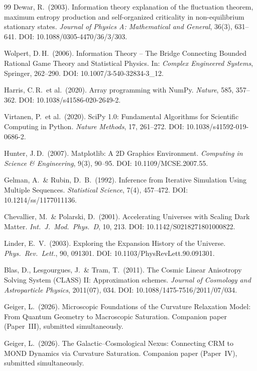 \documentclass[aps,prd,twocolumn,superscriptaddress,nofootinbib]{revtex4-2}
\begin{document}
\begin{thebibliography}{99}
Dewar, R.\ (2003).
Information theory explanation of the fluctuation theorem, maximum entropy production and self-organized criticality in non-equilibrium stationary states.
\textit{Journal of Physics A: Mathematical and General}, 36(3), 631--641.
DOI: 10.1088/0305-4470/36/3/303.

Wolpert, D.\,H.\ (2006).
Information Theory -- The Bridge Connecting Bounded Rational Game Theory and Statistical Physics.
In: \textit{Complex Engineered Systems}, Springer, 262--290.
DOI: 10.1007/3-540-32834-3\_12.

Harris, C.\,R.\ et al.\ (2020).
Array programming with NumPy.
\textit{Nature}, 585, 357--362.
DOI: 10.1038/s41586-020-2649-2.

Virtanen, P.\ et al.\ (2020).
SciPy 1.0: Fundamental Algorithms for Scientific Computing in Python.
\textit{Nature Methods}, 17, 261--272.
DOI: 10.1038/s41592-019-0686-2.

Hunter, J.\,D.\ (2007).
Matplotlib: A 2D Graphics Environment.
\textit{Computing in Science \& Engineering}, 9(3), 90--95.
DOI: 10.1109/MCSE.2007.55.

Gelman, A.\ \& Rubin, D.~B.\ (1992).
Inference from Iterative Simulation Using Multiple Sequences.
\textit{Statistical Science}, 7(4), 457--472.
DOI: 10.1214/ss/1177011136.

Chevallier, M.\ \& Polarski, D.\ (2001).
Accelerating Universes with Scaling Dark Matter.
\textit{Int.\ J.\ Mod.\ Phys.\ D}, 10, 213.
DOI: 10.1142/S0218271801000822.

Linder, E.~V.\ (2003).
Exploring the Expansion History of the Universe.
\textit{Phys.\ Rev.\ Lett.}, 90, 091301.
DOI: 10.1103/PhysRevLett.90.091301.

Blas, D., Lesgourgues, J.\ \& Tram, T.\ (2011).
The Cosmic Linear Anisotropy Solving System (CLASS) II: Approximation schemes.
\textit{Journal of Cosmology and Astroparticle Physics}, 2011(07), 034.
DOI: 10.1088/1475-7516/2011/07/034.

Geiger, L.\ (2026).
Microscopic Foundations of the Curvature Relaxation Model: From Quantum Geometry to Macroscopic Saturation.
Companion paper (Paper~III), submitted simultaneously.

Geiger, L.\ (2026).
The Galactic--Cosmological Nexus: Connecting CRM to MOND Dynamics via Curvature Saturation.
Companion paper (Paper~IV), submitted simultaneously.


\end{thebibliography}
\end{document}
